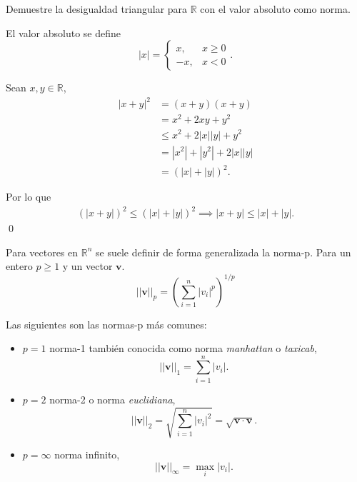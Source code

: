 \documentclass[12pt]{book}
\begin{document}
\begin{exampleenv}

Demuestre la desigualdad triangular para $\mathbb{R}$ con el valor absoluto como norma.

El valor absoluto se define 
\[
|x| =
\begin{cases}
    x, &  x\ge0 \\
    -x, & x<0
\end{cases}.
\]

Sean $x,y\in \mathbb{R}$,
\begin{align*}
    |x+y|^2&=(x+y)(x+y)\\
    &=x^2+2xy+y^2\\
    &\leq x^2+2|x||y|+y^2\\
    &=|x^2|+|y^2|+2|x||y|\\
    &=(|x|+|y|)^2.
\end{align*}

Por lo que
\begin{align*}
    (|x+y|)^2\leq(|x|+|y|)^2\implies |x+y|\leq |x|+|y|.
\end{align*}
\qed 
\end{exampleenv}

Para vectores en $\mathbb{R}^n$ se suele definir de forma generalizada la norma-p. Para un entero $p\ge 1$ y un vector $\mathbf{v}$.
\[
    ||\mathbf{v}||_p=(\sum_{i=1}^{n}|v_i|^p)^{1/p}
\]

Las siguientes son las normas-p más comunes:
\begin{itemize}
    \item $p=1$ norma-1 también conocida como norma \textit{manhattan} o \textit{taxicab},
    \[
        ||\mathbf{v}||_1=\sum_{i=1}^{n}|v_i|.
    \]
    \item $p=2$ norma-2 o norma \textit{euclidiana},
    \[
        ||\mathbf{v}||_2=\sqrt{\sum_{i=1}^{n}|v_i|^2}=\sqrt{\mathbf{v}\cdot \mathbf{v}}.
    \]
    \item $p=\infty$ norma infinito,
    \[
        ||\mathbf{v}||_\infty=\max_i|v_i|.
    \]
\end{itemize}
\end{document}
